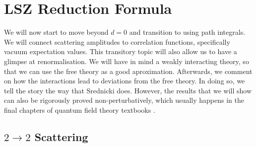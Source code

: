 
\chapter{LSZ Reduction Formula}%
\label{cha:lsz_reduction_formula}

We will now start to move beyond $d = 0$ and transition to using path integrals.
We will connect scattering amplitudes to correlation functions, specifically vacuum expectation values.
This transitory topic will also allow us to have a glimpse at renormalisation.
We will have in mind a weakly interacting theory, so that we can use the free theory as a good aproximation. Afterwards, we comment on how the interactions lead to deviations from the free theory.
In doing so, we tell the story the way that Srednicki \cite{srednicki} does. However, the results that we will show can also be rigorously proved non-perturbatively, which usually happens in the final chapters of quantum field theory textbooks \cite{peskin, weinberg}.

\section{\texorpdfstring{$2 \to 2$ }{}Scattering}%
\label{sec:$2 to 2$ _scattering}

